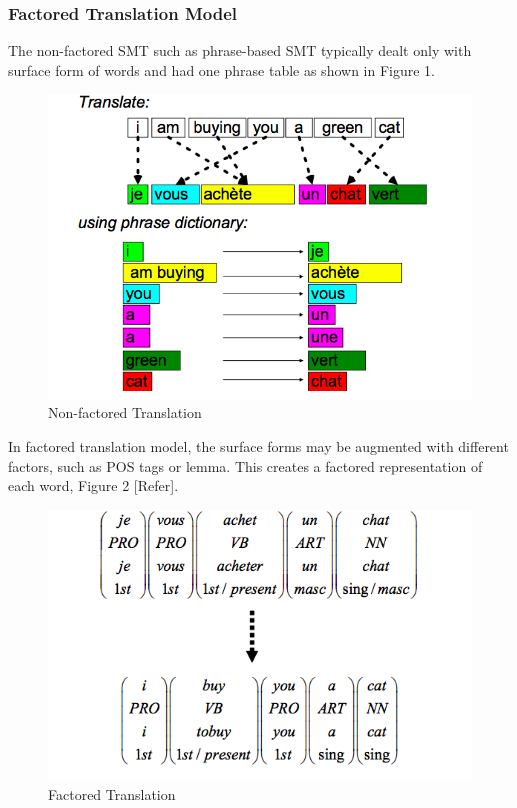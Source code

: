 \subsubsection{Factored Translation Model}
The non-factored SMT such as phrase-based SMT typically dealt only with surface form of words and had one phrase table as shown in Figure 1. 
\begin{figure}
\includegraphics[width=\textwidth]{figures/moses1.png}
\caption{Non-factored Translation} \label{fig1}
\end{figure}

In factored translation model, the surface forms may be augmented with different factors, such as POS tags or lemma. This creates a factored representation of each word, Figure 2 [Refer].
\begin{figure}
\includegraphics[width=\textwidth]{figures/moses2.png}
\caption{Factored Translation} \label{fig1}
\end{figure}

